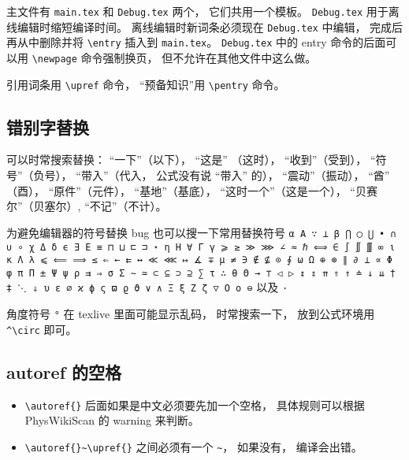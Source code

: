 主文件有 \verb|main.tex| 和 \verb|Debug.tex| 两个， 它们共用一个模板。 \verb|Debug.tex| 用于离线编辑时缩短编译时间。 离线编辑时新词条必须现在 \verb|Debug.tex| 中编辑， 完成后再从中删除并将 \verb|\entry| 插入到 \verb|main.tex|。 \verb|Debug.tex| 中的 entry 命令的后面可以用 \verb|\newpage| 命令强制换页， 但不允许在其他文件中这么做。

引用词条用 \verb|\upref| 命令， “预备知识”用 \verb|\pentry| 命令。

\subsection{错别字替换}
可以时常搜索替换： “一下”（以下）， “这是” （这时）， “收到”（受到）， “符号”（负号）， “带入”（代入， 公式没有说 “带入” 的）， “震动”（振动）， “酋” （酉）， “原件”（元件）， “基地”（基底）， “这时一个”（这是一个）， “贝赛尔”（贝塞尔）, “不记”（不计）。

为避免编辑器的符号替换 bug 也可以搜一下常用替换符号 \verb|α Α ∵ ⊥ β ⋂ ◯ ⋃ • ∩ ∪ ∘ χ Δ δ ϵ ∃ Ε ≡ ⊓ ⊔ ⊏ ⊐ ⋆ η Η ∀ Γ γ ⩾ ≥ ≫ ⋙ ∠ ≈ ℏ ⟺ ∈ ∫ ∬ ∭ ∞ ι κ Λ λ ⩽ ⟸ ⟹ ≤ ⇐ ← ⇇ ↔ ≪ ⋘ ↦ ∡ ∓ μ ≠ ∋ ∉ ⊈ ⊙ ∮ ω Ω ⊕ ⊗ ∥ ∂ ⟂ ∝ Φ φ π Π ± Ψ ψ ρ ⇉ ⇒ σ Σ ∼ ≃ ⊂ ⊆ ⊃ ⊇ ∑ τ ∴ θ Θ → ⊤ ◁ ▷ ↕ ⇕ ⇈ ⇑ ↑ ≐ ↓ ⇊ † ‡ ⋱ ⇓ υ ε ∅ ϰ ϕ ς ϖ ϱ ϑ ∨ ∧ Ξ ξ Ζ ζ ▽ Ο ο ⊖| 以及 \verb|·|

角度符号 \verb|°| 在 texlive 里面可能显示乱码， 时常搜索一下， 放到公式环境用 \verb|^\circ| 即可。

\subsection{autoref 的空格}
\begin{itemize}
\item \verb|\autoref{}| 后面如果是中文必须要先加一个空格， 具体规则可以根据 PhysWikiScan 的 warning 来判断。
\item \verb|\autoref{}~\upref{}| 之间必须有一个 \verb|~|， 如果没有， 编译会出错。
\end{itemize}
